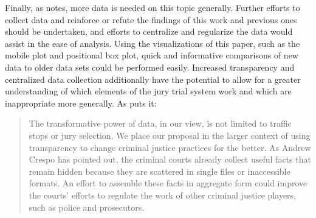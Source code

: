 Finally, as \cite{JurySunshineProj} notes, more data is needed on this topic generally. Further efforts to collect data and
reinforce or refute the findings of this work and previous ones should be undertaken, and efforts to centralize and regularize the
data would assist in the ease of analysis. Using the visualizations of this paper, such as the mobile plot and positional box
plot, quick and informative comparisons of new data to older data sets could be performed easily. Increased transparency and
centralized data collection additionally have the potential to allow for a greater understanding of which elements of the jury
trial system work and which are inappropriate more generally. As \citeauthor{JurySunshineProj} puts it:

\begin{quote}
  The transformative power of data, in our view, is not limited to traffic stops or jury selection. We place our proposal in the
  larger context of using transparency to change criminal justice practices for the better. As Andrew Crespo has pointed out, the
  criminal courts already collect useful facts that remain hidden because they are scattered in single files or inaccessible
  formats. An effort to assemble these facts in aggregate form could improve the courts' efforts to regulate the work of other
  criminal justice players, such as police and prosecutors.
\end{quote}

